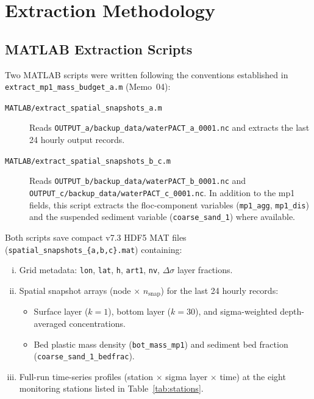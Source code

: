 \documentclass[11pt]{article}
\begin{document}
\section*{Extraction Methodology}

\subsection*{MATLAB Extraction Scripts}

Two MATLAB scripts were written following the conventions established in
\texttt{extract\_mp1\_mass\_budget\_a.m} (Memo~04):

\begin{description}
  \item[\texttt{MATLAB/extract\_spatial\_snapshots\_a.m}]
    Reads \texttt{OUTPUT\_a/backup\_data/waterPACT\_a\_0001.nc} and extracts
    the last 24 hourly output records.

  \item[\texttt{MATLAB/extract\_spatial\_snapshots\_b\_c.m}]
    Reads \texttt{OUTPUT\_b/backup\_data/waterPACT\_b\_0001.nc} and
    \texttt{OUTPUT\_c/backup\_data/waterPACT\_c\_0001.nc}.
    In addition to the mp1 fields, this script extracts the floc-component
    variables (\texttt{mp1\_agg}, \texttt{mp1\_dis}) and the suspended
    sediment variable (\texttt{coarse\_sand\_1}) where available.
\end{description}

Both scripts save compact v7.3 HDF5 MAT files
(\texttt{spatial\_snapshots\_\{a,b,c\}.mat}) containing:

\begin{enumerate}[(i)]
  \item Grid metadata: \texttt{lon}, \texttt{lat}, \texttt{h}, \texttt{art1},
        \texttt{nv}, $\Delta\sigma$ layer fractions.
  \item Spatial snapshot arrays (node $\times$ $n_\text{snap}$) for the last
        24 hourly records:
        \begin{itemize}
          \item Surface layer ($k=1$), bottom layer ($k=30$), and
                sigma-weighted depth-averaged concentrations.
          \item Bed plastic mass density (\texttt{bot\_mass\_mp1}) and
                sediment bed fraction (\texttt{coarse\_sand\_1\_bedfrac}).
        \end{itemize}
  \item Full-run time-series profiles (station $\times$ sigma layer $\times$ time)
        at the eight monitoring stations listed in
        Table~\ref{tab:stations}.
\end{enumerate}
\end{document}
